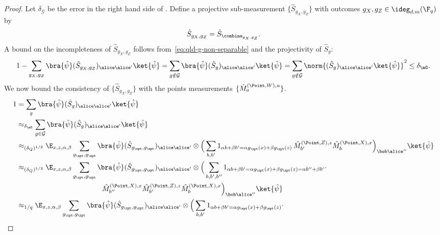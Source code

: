 \begin{proof}
	Let $\delta_{\mathcal{G}}$ be the error in the right hand side of . Define a projective sub-measurement $\{\hat{S}_{g_X, g_Z}\}$ with outcomes $g_X, g_Z \in \ideg_{d,m}(\F_q)$ by
        \begin{equation}
          \hat{S}_{g_X, g_Z} = \hat{S}_{\combine_{g_X, g_Z}}.
        \end{equation}
        A bound on the incompleteness of $\hat{S}_{g_X, g_Z}$ follows from~\eqref{eq:qld-g-non-separable} and the projectivity of $\hat{S}_g$:
        \begin{equation} 1 - \sum_{g_X, g_Z} \bra{\hat{\psi}} (\hat{S}_{g_X, g_Z})_{\alice \alice'} \ket{\hat{\psi}} = \sum_{g \notin \mathcal{G}} \bra{\hat{\psi}} (\hat{S}_g)_{\alice \alice'} \ket{\hat{\psi}} = \sum_{g \notin \mathcal{G}} \norm{ (\hat{S}_g)_{\alice \alice'} \ket{\hat{\psi}} }^2 \leq\delta _{\mG}. \label{eq:qld-sgg-completeness} \end{equation}
        We now bound the consistency of $\{\hat{S}_{g_X, g_Z}\}$ with the points measurements $\{\hat{M}^{(\Point, W), u}_{a}\}$.
	\begin{align}
		1 &= \sum_g\bra{\hat{\psi}}  (\hat{S}_g)_{\alice \alice'} \ket{\hat{\psi}} \label{eq:qld-s-good-and-bad} \\
		&\approx_{\delta_{\mG}} \sum_{g \in \mathcal{G}} \bra{\hat{\psi}} (\hat{S}_g)_{\alice \alice'} \ket{\hat{\psi}} \label{eq:qld-s-good-g}\\
                  &\approx_{(\delta_Q)^{1/2}} \E_{x,z,\alpha,\beta} \sum_{g_\xpt, g_\zpt}\bra{\hat{\psi}}  (\hat{S}_{g_\xpt,g_\zpt})_{\alice \alice'} \otimes \Big ( \sum_{b,b'} 1_{\alpha b + \beta b' = \alpha g_\xpt (x) + \beta g_\zpt(z)} \, \hat{M}^{(\Point,Z),z}_{b'} \hat{M}^{(\Point,X),x}_{b} \Big)_{\bob \alice''} \ket{\hat{\psi}} \label{eq:qld-s-mm}\\
                  &\approx _{(\delta_Q)^{1/2}} \E_{x,z,\alpha,\beta} \sum_{g_\xpt, g_\zpt}\bra{\hat{\psi}}  (\hat{S}_{g_\xpt,g_\zpt})_{\alice \alice'} \otimes \Big ( \sum_{b,b', b''} 1_{\alpha b + \beta b' = \alpha g_\xpt (x) + \beta g_\zpt(z) = \alpha b'' + \beta b'} \cdot\, \notag \\
          &\hspace{12em} \hat{M}^{(\Point, X), x}_{b''} \hat{M}^{(\Point,Z),z}_{b'} \hat{M}^{(\Point,X),x}_{b} \Big)_{\bob \alice''} \ket{\hat{\psi}} \label{eq:qld-s-mmm} \\
      &\approx _{1/q} \E_{x,z,\alpha,\beta} \sum_{g_\xpt, g_\zpt}\bra{\hat{\psi}}  (\hat{S}_{g_\xpt,g_\zpt})_{\alice \alice'} \otimes \Big ( \sum_{b,b'} 1_{\alpha b + \beta b' = \alpha g_\xpt (x) + \beta g_\zpt(z) } \cdot \,\notag\\

\end{align}
\end{proof}
